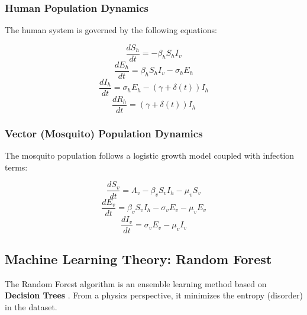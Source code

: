 \documentclass[12pt, a4paper]{article}
\begin{document}
\subsubsection{Human Population Dynamics}
The human system is governed by the following equations:

\begin{equation}
    \frac{dS_h}{dt} = - \beta_h S_h I_v
\end{equation}
\vspace{0.5cm}
\begin{equation}
    \frac{dE_h}{dt} = \beta_h S_h I_v - \sigma_h E_h
\end{equation}
\vspace{0.5cm}
\begin{equation}
    \frac{dI_h}{dt} = \sigma_h E_h - (\gamma + \delta(t)) I_h
\end{equation}
\vspace{0.5cm}
\begin{equation}
    \frac{dR_h}{dt} = (\gamma + \delta(t)) I_h
\end{equation}

\subsubsection{Vector (Mosquito) Population Dynamics}
The mosquito population follows a logistic growth model coupled with infection terms:

\begin{equation}
    \frac{dS_v}{dt} = \Lambda_v - \beta_v S_v I_h - \mu_v S_v
\end{equation}
\vspace{0.5cm}
\begin{equation}
    \frac{dE_v}{dt} = \beta_v S_v I_h - \sigma_v E_v - \mu_v E_v
\end{equation}
\vspace{0.5cm}
\begin{equation}
    \frac{dI_v}{dt} = \sigma_v E_v - \mu_v I_v
\end{equation}

\newpage

\subsection{Machine Learning Theory: Random Forest}
The Random Forest algorithm is an ensemble learning method based on \textbf{Decision Trees} \cite{ref5}. From a physics perspective, it minimizes the entropy (disorder) in the dataset.
\end{document}
